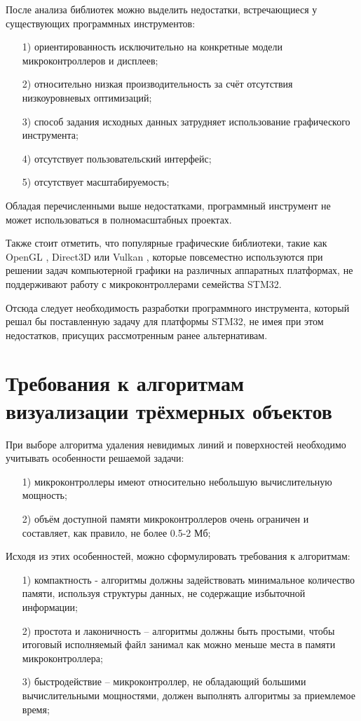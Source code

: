 После анализа библиотек можно выделить недостатки, встречающиеся у существующих программных инструментов:
\begin{enumerate}
	\item[1)] ориентированность исключительно на конкретные модели микроконтроллеров и дисплеев;
	\item[2)] относительно низкая производительность за счёт отсутствия низкоуровневых оптимизаций;
	\item[3)] способ задания исходных данных затрудняет использование графического инструмента;
	\item[4)] отсутствует пользовательский интерфейс;
	\item[5)] отсутствует масштабируемость;
\end{enumerate}
Обладая перечисленными выше недостатками, программный инструмент не может использоваться в полномасштабных проектах.

Также стоит отметить, что популярные графические библиотеки, такие как OpenGL \cite{opengl}, Direct3D \cite{direct3d} или Vulkan \cite{vulkan}, которые повсеместно используются при решении задач компьютерной графики на различных аппаратных платформах, не поддерживают работу с микроконтроллерами семейства STM32.

Отсюда следует необходимость разработки программного инструмента, который решал бы поставленную задачу для платформы STM32, не имея при этом недостатков, присущих рассмотренным ранее альтернативам.

\section{Требования к алгоритмам визуализации трёхмерных объектов}
При выборе алгоритма удаления невидимых линий и поверхностей необходимо учитывать особенности решаемой задачи:
\begin{enumerate}
	\item[1)] микроконтроллеры имеют относительно небольшую вычислительную мощность;
	\item[2)] объём доступной памяти микроконтроллеров очень ограничен и составляет, как правило, не более 0.5-2 Мб;
\end{enumerate}

Исходя из этих особенностей, можно сформулировать требования к алгоритмам:
\begin{enumerate}
	\item[1)] компактность - алгоритмы должны задействовать минимальное количество памяти, используя структуры данных, не содержащие избыточной информации;
	\item[2)] простота и лаконичность – алгоритмы должны быть простыми, чтобы итоговый исполняемый файл занимал как можно меньше места в памяти микроконтроллера;
	\item[3)] быстродействие – микроконтроллер, не обладающий большими вычислительными мощностями, должен выполнять алгоритмы за приемлемое время;
\end{enumerate}

